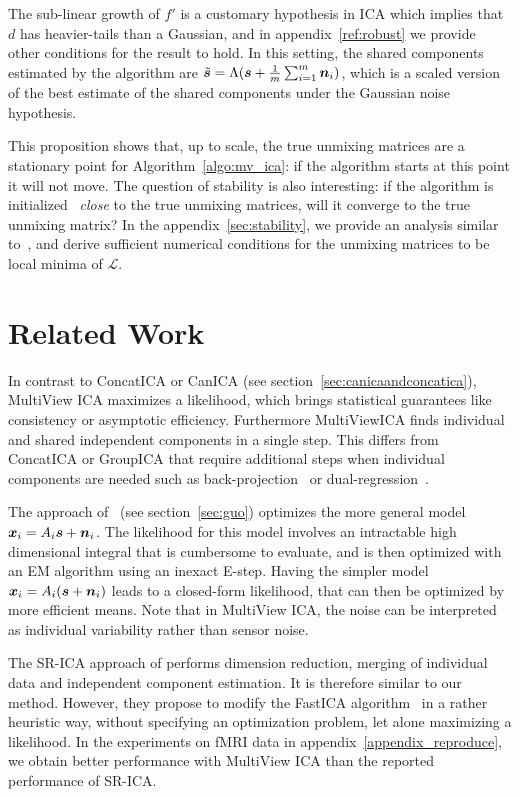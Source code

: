%
The sub-linear growth of $f'$ is a customary hypothesis in ICA which implies that $d$ has heavier-tails than a Gaussian, and in appendix~\ref{ref:robust} we provide other conditions for the result to hold.
%
In this setting, the shared components estimated by the algorithm are $\tilde{\boldsymbol{s}} = \Lambda (\boldsymbol{s} + \frac1m \sum_{i=1}^m \boldsymbol{n}_i)$, which is a scaled version of the best estimate of the shared components under the Gaussian noise hypothesis.

This proposition shows that, up to scale, the true unmixing matrices are a stationary point for Algorithm~\ref{algo:mv_ica}: if the algorithm starts at this point it will not move.
%
The question of stability is also interesting: if the algorithm is initialized ~\emph{close} to the true unmixing matrices, will it converge to the true unmixing matrix?
%
In the appendix~\ref{sec:stability}, we provide an analysis similar to~\cite{cardoso1998blind}, and derive sufficient numerical conditions for the unmixing matrices to be local minima of $\mathcal{L}$.
%

\section{Related Work}
In contrast to ConcatICA or CanICA (see section~\ref{sec:canicaandconcatica}),
MultiView ICA maximizes a likelihood, which brings statistical guarantees like
consistency or asymptotic efficiency. Furthermore MultiViewICA finds individual
and shared independent components in a single step. This differs from ConcatICA or
GroupICA that require additional steps when individual components are needed
such as back-projection~\cite{calhoun2001method} or dual-regression~\cite{beckmann2009group}.

The approach of~\cite{guo2008unified} (see section~\ref{sec:guo}) optimizes the more
general model $\boldsymbol{x}_i = A_i\boldsymbol{s} + \boldsymbol{n}_i$. 
The likelihood for this model involves an intractable high dimensional integral
that is cumbersome to evaluate, and is then optimized with an EM algorithm using
an inexact E-step.
Having the simpler model $\boldsymbol{x}_i = A_i(\boldsymbol{s} + \boldsymbol{n}_i)$ leads to a closed-form likelihood,
that can then be optimized by more efficient means.
Note that in MultiView ICA, the noise can be interpreted as individual variability rather than sensor noise. %


The SR-ICA approach of \cite{zhang2016searchlight} performs dimension reduction,
merging of individual data and independent component estimation. It is therefore similar to our method.
However, they propose to modify the FastICA algorithm~\cite{hyvarinen1999fast} in a rather heuristic way, without specifying an optimization problem, let alone maximizing a likelihood. In the experiments on fMRI data in appendix~\ref{appendix_reproduce}, we obtain better performance with MultiView ICA than the reported performance of SR-ICA.

